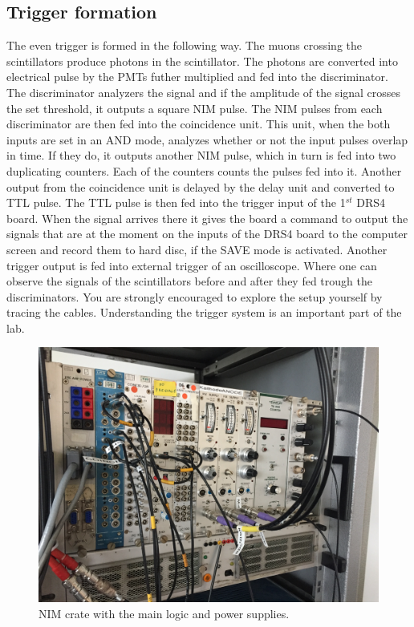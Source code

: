 \documentclass[12pt]{article}
\begin{document}
\subsection{Trigger formation}
The even trigger is formed in the following way. The muons crossing the scintillators produce photons in the scintillator. The photons are converted into electrical pulse by the PMTs futher multiplied and fed into the discriminator. The discriminator analyzers the signal and if the amplitude of the signal crosses the set threshold, it outputs a square NIM pulse. The NIM pulses from each discriminator are then fed into the coincidence unit. This unit, when the both inputs are set in an AND mode, analyzes whether or not the input pulses overlap in time. If they do, it outputs another NIM pulse, which in turn is fed into two duplicating counters. Each of the counters counts the pulses fed into it. Another output from the coincidence unit is delayed by the delay unit and converted to TTL pulse. The TTL pulse is then fed into the trigger input of the 1$^{st}$ DRS4 board. When the signal arrives there it gives the board a command to output the signals that are at the moment on the inputs of the DRS4 board to the computer screen and record them to hard disc, if the SAVE mode is activated. Another trigger output is fed into external trigger of an oscilloscope. Where one can observe the signals of the scintillators before and after they fed trough the discriminators. You are strongly encouraged to explore the setup yourself by tracing the cables. Understanding the trigger system is an important part of the lab. 

\begin{figure}[!h]
\includegraphics[width=13cm]{pics/NIM_crate.jpg}
\centering
\caption{NIM crate with the main logic and power supplies.}
\label{fig:NIM_crate}
\end{figure}
\end{document}
